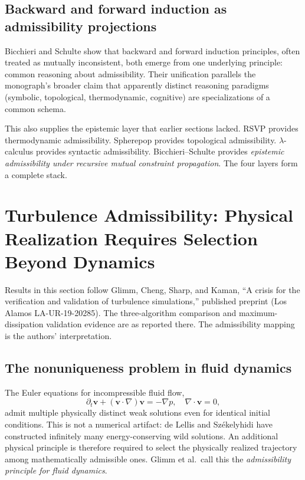\documentclass[12pt, a4paper]{article}
\theoremstyle{plain}
\theoremstyle{definition}
\theoremstyle{remark}
\begin{document}
\subsection{Backward and forward induction as admissibility projections}

Bicchieri and Schulte show that backward and forward induction
principles, often treated as mutually inconsistent, both emerge from
one underlying principle: common reasoning about admissibility.
Their unification parallels the monograph's broader claim that
apparently distinct reasoning paradigms (symbolic, topological,
thermodynamic, cognitive) are specializations of a common schema.

This also supplies the epistemic layer that earlier sections lacked.
RSVP provides thermodynamic admissibility.
Spherepop provides topological admissibility.
$\lambda$-calculus provides syntactic admissibility.
Bicchieri--Schulte provides \emph{epistemic admissibility under
recursive mutual constraint propagation}.
The four layers form a complete stack.

\section{Turbulence Admissibility: Physical Realization Requires
  Selection Beyond Dynamics}
\label{sec:turbulence}

\begin{established}
  Results in this section follow Glimm, Cheng, Sharp, and Kaman,
  ``A crisis for the verification and validation of turbulence
  simulations,'' published preprint (Los Alamos LA-UR-19-20285).
  The three-algorithm comparison and maximum-dissipation validation
  evidence are as reported there.
  The admissibility mapping is the authors' interpretation.
\end{established}

\subsection{The nonuniqueness problem in fluid dynamics}

The Euler equations for incompressible fluid flow,
\[
  \partial_t \mathbf{v} + (\mathbf{v}\cdot\nabla)\mathbf{v}
  = -\nabla p, \quad \nabla\cdot\mathbf{v} = 0,
\]
admit multiple physically distinct weak solutions even for identical
initial conditions.
This is not a numerical artifact: de Lellis and Székelyhidi have
constructed infinitely many energy-conserving wild solutions.
An additional physical principle is therefore required to select the
physically realized trajectory among mathematically admissible ones.
Glimm et al.\ call this the \emph{admissibility principle for
fluid dynamics}.
\end{document}
